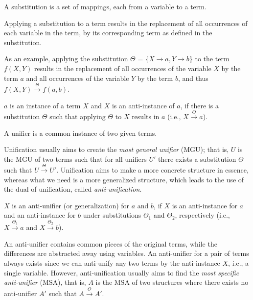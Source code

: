 \begin{defn}[Substitution]\label{def:substitution}
A substitution is a set of mappings, each from a variable to a term.
\end{defn}

\begin{defn}\label{def:substitution}
Applying a substitution to a term results in the replacement of all occurrences of each variable in the term, by its corresponding term as defined in the substitution.
\end{defn}

As an example, applying the substitution $\Theta$ = \{$X \rightarrow a, Y \rightarrow b $\}
to the term $f(X,Y)$ results in the replacement of all occurrences of the variable $X$ by the term $a$ and all occurrences of the variable $Y$ by the term $b$, and thus $f(X,Y)\xrightarrow{\Theta} f(a,b)$.

\begin{defn}\label{def:instance}
$a$ is an instance of a term $X$ and $X$ is an anti-instance of $a$, if there is a substitution $\Theta$ such that applying $\Theta$ to $X$ results in $a$ (i.e., $X\xrightarrow{\Theta}a$).
\end{defn}

\begin{defn}[Unifier]\label{def:unifier}
A unifier is a common instance of two given terms.
\end{defn}

Unification usually aims to create the \emph{most general unifier} (MGU); that is, $U$ is the MGU of two terms such that for all unifiers $U'$ there exists a substitution $\Theta$ such that $U\xrightarrow{\Theta}U'$. Unification aims to make a more concrete structure in essence, whereas what we need is a more generalized structure, which leads to the use of the dual of unification, called \emph{anti-unification}.

\begin{defn}\label{def:generalization}
$X$ is an anti-unifier (or generalization) for $a$ and $b$, if $X$ is an anti-instance for $a$ and an anti-instance for $b$ under substitutions $\Theta_1$ and $\Theta_2$, respectively (i.e., $X\xrightarrow{\Theta_1}a$ and $X\xrightarrow{\Theta_2}b$).
\end{defn}

An anti-unifier contains common pieces of the original terms, while the differences are abstracted away using variables. An anti-unifier for a pair of terms always exists since we can anti-unify any two terms by the anti-instance $X$, i.e., a single variable. However, anti-unification usually aims to find the \emph{most specific anti-unifier} (MSA), that is, $A$ is the MSA of two structures where there exists no anti-unifier $A'$ such that $A\xrightarrow{\Theta}A'$.

